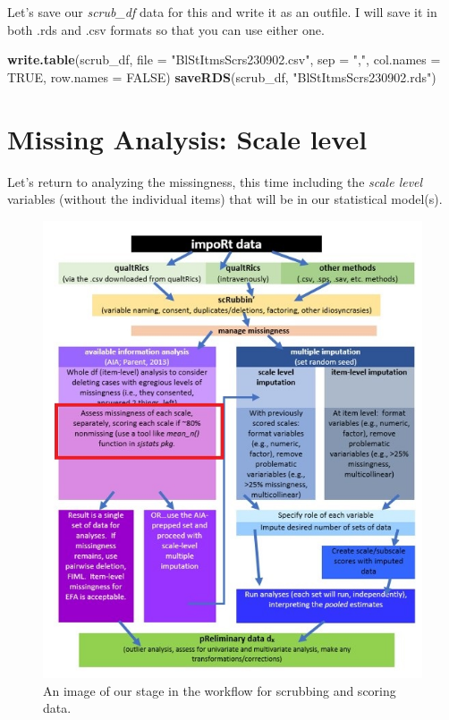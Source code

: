 \documentclass[
  11pt,
]{book}
\newenvironment{Shaded}{\begin{snugshade}}{\end{snugshade}}
\newcommand{\AttributeTok}[1]{\textcolor[rgb]{0.27,0.27,0.27}{#1}}
\newcommand{\ConstantTok}[1]{\textcolor[rgb]{0.37,0.37,0.37}{#1}}
\newcommand{\FunctionTok}[1]{\textcolor[rgb]{0.27,0.27,0.27}{\textbf{#1}}}
\newcommand{\NormalTok}[1]{#1}
\newcommand{\StringTok}[1]{\textcolor[rgb]{0.5,0.5,0.5}{#1}}
\begin{document}
Let's save our \emph{scrub\_df} data for this and write it as an outfile. I will save it in both .rds and .csv formats so that you can use either one.

\begin{Shaded}
\begin{Highlighting}[]
\FunctionTok{write.table}\NormalTok{(scrub\_df, }\AttributeTok{file =} \StringTok{"BlStItmsScrs230902.csv"}\NormalTok{, }\AttributeTok{sep =} \StringTok{","}\NormalTok{, }\AttributeTok{col.names =} \ConstantTok{TRUE}\NormalTok{,}
    \AttributeTok{row.names =} \ConstantTok{FALSE}\NormalTok{)}
\FunctionTok{saveRDS}\NormalTok{(scrub\_df, }\StringTok{"BlStItmsScrs230902.rds"}\NormalTok{)}
\end{Highlighting}
\end{Shaded}

\hypertarget{missing-analysis-scale-level}{%
\section{Missing Analysis: Scale level}\label{missing-analysis-scale-level}}

Let's return to analyzing the missingness, this time including the \emph{scale level} variables (without the individual items) that will be in our statistical model(s).

\begin{figure}
\centering
\includegraphics{images/Ch02/wrkflow_scale_lvl.jpg}
\caption{An image of our stage in the workflow for scrubbing and scoring data.}
\end{figure}
\end{document}
